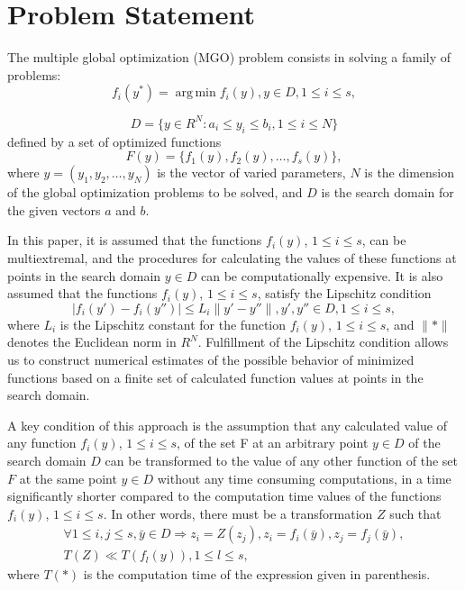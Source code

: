 \documentclass[review]{elsarticle}
\DeclareMathOperator*{\argmin}{arg\,min}
\begin{document}
\section{Problem Statement}\label{sec:2}

The multiple global optimization (MGO) problem consists in solving a family of problems:
\begin{equation}\label{eq:1}
f_i(y^*) = \argmin f_i(y), y \in D, 1 \leq i \leq s,
\end{equation}

\begin{equation}\label{eq:2}
D  = \{ y\in R^N: a_i \leq y_i \leq b_i, 1 \leq i \leq N \}
\end{equation}
defined by a set of optimized functions
\begin{equation}\label{eq:3}
F(y) = \{ f_1(y),  f_2(y),\dots, f_s(y) \},
\end{equation}
where $y = (y_1,y_2,\dots,y_N)$ is the vector of varied parameters, $N$ is the dimension of the global optimization problems to be solved, and $D$ is the search domain for the given vectors $a$ and $b$. 

In this paper, it is assumed that the functions $f_i(y)$, $1 \leq i \leq s$, can be multiextremal, and the procedures for calculating the values of these functions at points in the search domain $y \in D$ can be computationally expensive. It is also assumed that the functions $f_i(y)$, $1 \leq i \leq s$, satisfy the Lipschitz condition
\begin{equation}\label{eq:4}
|f_i (y')-f_i (y'')| \leq L_i \|y'-y''\|, y',y''\in D, 1 \leq i \leq s,
\end{equation}
where $L_i$ is the Lipschitz constant for the function $f_i(y)$, $1 \leq i \leq s$, and ${\|*\|}$ denotes the Euclidean norm in $R^N$. Fulfillment of the Lipschitz condition allows us to construct numerical estimates of the possible behavior of minimized functions based on a finite set of calculated function values at points in the search domain.


A key condition of this approach is the assumption that any calculated value of any function $f_i(y)$, $1 \leq i \leq s$, of the set F at an arbitrary point $y \in D$ of the search domain $D$ can be transformed to the value of any other function of the set $F$ at the same point $y \in D$ without any time consuming computations, in a time significantly shorter compared to the computation time values of the functions $f_i(y)$, $1 \leq i \leq s$. In other words, there must be a transformation $Z$ such that
\begin{equation}\label{eq:5}
\begin{matrix}
\forall 1 \leq i, j \leq s, \bar{y} \in D \Rightarrow z_i=Z(z_j ), z_i = f_i (\bar{y}),z_j=f_j (\bar{y}), \\
T(Z) \ll T(f_l (y) ),1 \leq l \leq s,
\end{matrix}
\end{equation}
where $T(*)$  is the computation time of the expression given in parenthesis.
\end{document}
